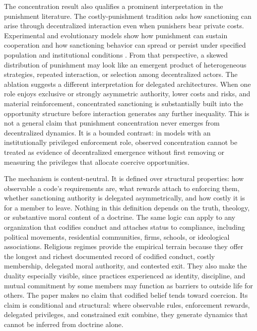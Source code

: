 \documentclass[12pt]{article}
\begin{document}
The concentration result also qualifies a prominent interpretation in the punishment literature. The costly-punishment tradition asks how sanctioning can arise through decentralized interaction even when punishers bear private costs. Experimental and evolutionary models show how punishment can sustain cooperation and how sanctioning behavior can spread or persist under specified population and institutional conditions \citep{fehrgachter2000,boydgintisbowles2010,hauertetal2007}. From that perspective, a skewed distribution of punishment may look like an emergent product of heterogeneous strategies, repeated interaction, or selection among decentralized actors. The ablation suggests a different interpretation for delegated architectures. When one role enjoys exclusive or strongly asymmetric authority, lower costs and risks, and material reinforcement, concentrated sanctioning is substantially built into the opportunity structure before interaction generates any further inequality. This is not a general claim that punishment concentration never emerges from decentralized dynamics. It is a bounded contrast: in models with an institutionally privileged enforcement role, observed concentration cannot be treated as evidence of decentralized emergence without first removing or measuring the privileges that allocate coercive opportunities.

The mechanism is content-neutral. It is defined over structural properties: how observable a code's requirements are, what rewards attach to enforcing them, whether sanctioning authority is delegated asymmetrically, and how costly it is for a member to leave. Nothing in this definition depends on the truth, theology, or substantive moral content of a doctrine. The same logic can apply to any organization that codifies conduct and attaches status to compliance, including political movements, residential communities, firms, schools, or ideological associations. Religious regimes provide the empirical terrain because they offer the longest and richest documented record of codified conduct, costly membership, delegated moral authority, and contested exit. They also make the duality especially visible, since practices experienced as identity, discipline, and mutual commitment by some members may function as barriers to outside life for others. The paper makes no claim that codified belief tends toward coercion. Its claim is conditional and structural: where observable rules, enforcement rewards, delegated privileges, and constrained exit combine, they generate dynamics that cannot be inferred from doctrine alone.
\end{document}
